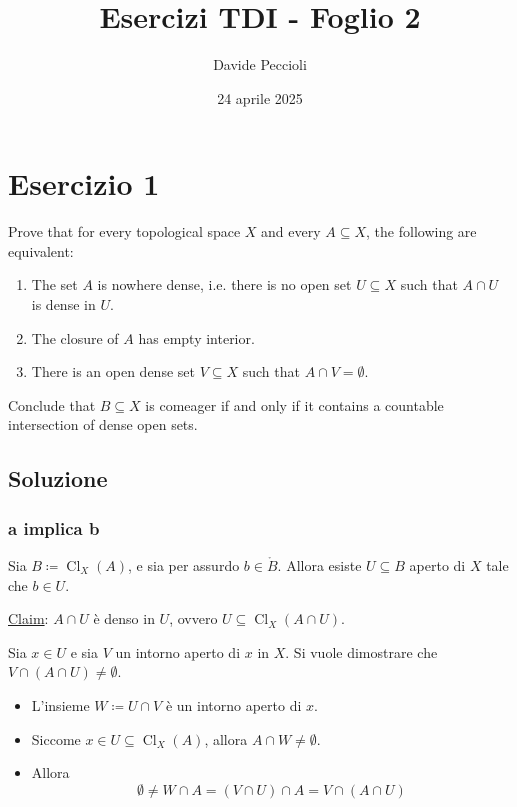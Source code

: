 \documentclass{article}
\author{Davide Peccioli}
\date{24 aprile 2025}
\title{Esercizi TDI - Foglio 2}
\newcommand{\1}{\mathds{1}}
\renewcommand{\href}[2]{#2}
\begin{document}
\maketitle
\section{Esercizio 1}
\label{sec:orgc42a61e}

Prove that for every \href{../../../../../../org/roam/20250103145124-topologia.org}{topological space} \(X\) and every \(A \subseteq X\), the following are equivalent:

\begin{enumerate}
\item The set \(A\) is \href{../../../../../../org/roam/20250417180515-insieme_mai_denso.org}{nowhere dense}, i.e. there is no open set \(U \subseteq X\) such that \(A \cap U\) is dense in \(U\).
\item The closure of \(A\) has empty \href{../../../../../../org/roam/20250122181431-parte_interna.org}{interior}.
\item There is an open dense set \(V \subseteq X\) such that \(A \cap V = \emptyset\).
\end{enumerate}

Conclude that \(B \subseteq X\) is \href{../../../../../../org/roam/20250419122752-insieme_magro.org}{comeager} if and only if it contains a countable intersection of dense open sets.
\subsection{Soluzione}
\label{sec:org0c27de0}

\subsubsection{a implica b}
\label{sec:org06f12d4}

Sia \(B\coloneqq \operatorname{Cl}_{X}(A)\), e sia per assurdo \(b \in \mathring{B}\). Allora esiste \(U \subseteq B\) aperto di \(X\) tale che \(b \in U\).

\uline{Claim}: \(A\cap U\) è denso in \(U\), ovvero \(U \subseteq \operatorname{Cl}_{X}(A\cap U)\).

Sia \(x \in U\) e sia \(V\) un intorno aperto di \(x\) in \(X\). Si vuole dimostrare che \(V\cap(A\cap U)\neq \emptyset\).
\begin{itemize}
\item L'insieme \(W\coloneqq U\cap V\) è un intorno aperto di \(x\).
\item Siccome \(x \in U \subseteq \operatorname{Cl}_{X}(A)\), allora \(A\cap W \neq \emptyset\).
\item Allora
\begin{equation*}
  	\emptyset\neq W\cap A = (V\cap U)\cap A = V\cap(A\cap U)
\end{equation*}
\end{itemize}
\end{document}
